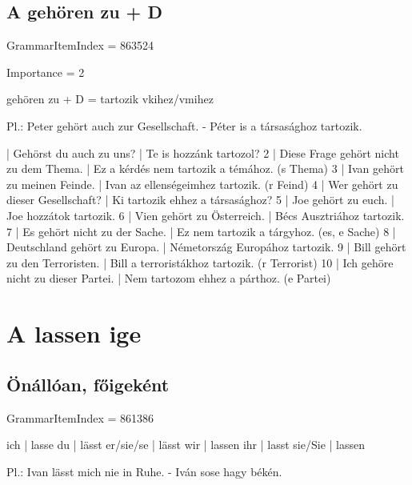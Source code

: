 \documentclass{article}
\newenvironment{desc}{\verbatim}{\endverbatim}
\newenvironment{exmp}{\verbatim}{\endverbatim}
\begin{document}
\subsection{A gehören zu + D}

GrammarItemIndex = 863524

Importance = 2

\begin{desc}
gehören zu + D = tartozik vkihez/vmihez

Pl.: Peter gehört auch zur Gesellschaft. - Péter is a társasághoz tartozik.
\end{desc}

\begin{exmp}
1 | Gehörst du auch zu uns? | Te is hozzánk tartozol?
2 | Diese Frage gehört nicht zu dem Thema. | Ez a kérdés nem tartozik a témához. (s Thema)
3 | Ivan gehört zu meinen Feinde. | Ivan az ellenségeimhez tartozik. (r Feind)
4 | Wer gehört zu dieser Gesellschaft? | Ki tartozik ehhez a társasághoz?
5 | Joe gehört zu euch. | Joe hozzátok tartozik.
6 | Vien gehört zu Österreich. | Bécs Ausztriához tartozik.
7 | Es gehört nicht zu der Sache. | Ez nem tartozik a tárgyhoz. (es, e Sache)
8 | Deutschland gehört zu Europa. | Németország Europához tartozik.
9 | Bill gehört zu den Terroristen. | Bill a terroristákhoz tartozik. (r Terrorist)
10 | Ich gehöre nicht zu dieser Partei. | Nem tartozom ehhez a párthoz. (e Partei)
\end{exmp}

\section{A lassen ige}

\subsection{Önállóan, főigeként}

GrammarItemIndex = 861386

\begin{desc}
ich       | lasse
du        | lässt
er/sie/se | lässt
wir       | lassen
ihr       | lasst
sie/Sie   | lassen

Pl.: Ivan lässt mich nie in Ruhe. - Iván sose hagy békén.
\end{desc}
\end{document}
